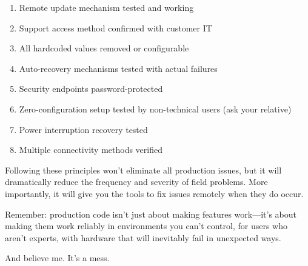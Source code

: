 \begin{enumerate}
\item Remote update mechanism tested and working
\item Support access method confirmed with customer IT
\item All hardcoded values removed or configurable
\item Auto-recovery mechanisms tested with actual failures
\item Security endpoints password-protected
\item Zero-configuration setup tested by non-technical users (ask your relative)
\item Power interruption recovery tested
\item Multiple connectivity methods verified
\end{enumerate}

Following these principles won't eliminate all production issues, but it will dramatically reduce the frequency and severity of field problems. More importantly, it will give you the tools to fix issues remotely when they do occur.

Remember: production code isn't just about making features work—it's about making them work reliably in environments you can't control, for users who aren't experts, with hardware that will inevitably fail in unexpected ways.

And believe me. It's a mess.